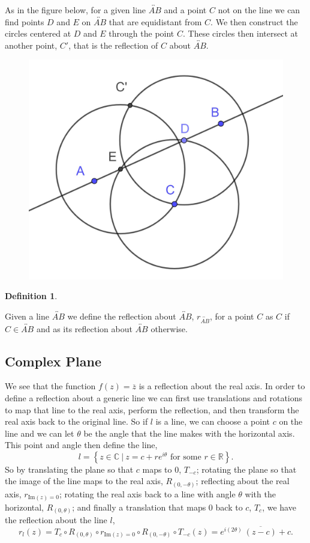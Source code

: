 \documentclass[
]{book}
\theoremstyle{definition}
\newtheorem{definition}{Definition}[chapter]
\theoremstyle{definition}
\theoremstyle{definition}
\theoremstyle{definition}
\theoremstyle{remark}
\begin{document}
As in the figure below, for a given line \(\overleftrightarrow{AB}\) and a point \(C\) not on the line we can find points \(D\) and \(E\) on \(\overleftrightarrow{AB}\) that are equidistant from \(C\). We then construct the circles centered at \(D\) and \(E\) through the point \(C\). These circles then intersect at another point, \(C'\), that is the reflection of \(C\) about \(\overleftrightarrow{AB}\).

\begin{figure}

{\centering \includegraphics[width=0.35\linewidth]{images/Reflection_Synthetic} 

}

\end{figure}

\begin{definition}
\protect\hypertarget{def:unlabeled-div-275}{}\label{def:unlabeled-div-275}

Given a line \(\overleftrightarrow{AB}\) we define the reflection about \(\overleftrightarrow{AB}\), \(r_{\overleftrightarrow{AB}}\), for a point \(C\) as \(C\) if \(C\in \overleftrightarrow{AB}\) and as its reflection about \(\overleftrightarrow{AB}\) otherwise.

\end{definition}

\hypertarget{complex-plane-3}{%
\subsection{Complex Plane}\label{complex-plane-3}}

We see that the function \(f(z)=\overline{z}\) is a reflection about the real axis. In order to define a reflection about a generic line we can first use translations and rotations to map that line to the real axis, perform the reflection, and then transform the real axis back to the original line. So if \(l\) is a line, we can choose a point \(c\) on the line and we can let \(\theta\) be the angle that the line makes with the horizontal axis. This point and angle then define the line,
\[l = \left\{ z\in \mathbb{C} \: \vert \: z=c+re^{i\theta} \mbox{ for some } r\in \mathbb{R} \right\}.\] So by translating the plane so that \(c\) maps to \(0\), \(T_{-c}\); rotating the plane so that the image of the line maps to the real axis, \(R_{(0,-\theta)}\); reflecting about the real axis, \(r_{\mbox{Im}(z)=0}\); rotating the real axis back to a line with angle \(\theta\) with the horizontal, \(R_{(0,\theta)}\); and finally a translation that maps \(0\) back to \(c\), \(T_{c}\), we have the reflection about the line \(l\),
\[r_l (z) = T_c \circ R_{(0,\theta)} \circ r_{\mbox{Im}(z)=0} \circ R_{(0,-\theta)} \circ T_{-c} (z) = e^{i(2\theta )} \: \overline{(z-c)} +c.\]
\end{document}
